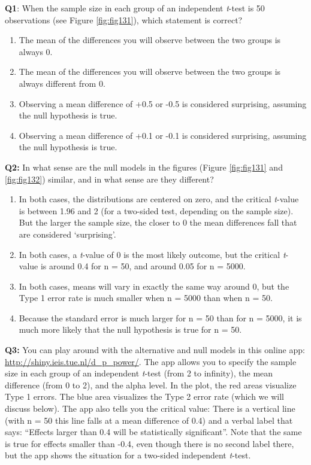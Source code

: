 \documentclass[
]{krantz}
\providecommand{\tightlist}{%
  \setlength{\itemsep}{0pt}\setlength{\parskip}{0pt}}
\begin{document}
\textbf{Q1}: When the sample size in each group of an independent \emph{t}-test is 50
observations (see Figure \ref{fig:fig131}), which statement is correct?

\begin{enumerate}
\def\labelenumi{\Alph{enumi})}
\tightlist
\item
  The mean of the differences you will observe between the two groups is always 0.
\item
  The mean of the differences you will observe between the two groups is always different from 0.
\item
  Observing a mean difference of +0.5 or -0.5 is considered surprising, assuming the null hypothesis is true.
\item
  Observing a mean difference of +0.1 or -0.1 is considered surprising, assuming the null hypothesis is true.
\end{enumerate}

\textbf{Q2:} In what sense are the null models in the figures (Figure \ref{fig:fig131} and \ref{fig:fig132}) similar, and in what sense are they different?

\begin{enumerate}
\def\labelenumi{\Alph{enumi})}
\tightlist
\item
  In both cases, the distributions are centered on zero, and the critical
  \emph{t}-value is between 1.96 and 2 (for a two-sided test, depending on the sample size). But the larger the sample size, the closer to 0 the mean differences fall that are considered `surprising'.
\item
  In both cases, a \emph{t}-value of 0 is the most likely outcome, but the critical \emph{t}-value is around 0.4 for n = 50, and around 0.05 for n = 5000.
\item
  In both cases, means will vary in exactly the same way around 0, but the Type 1 error rate is much smaller when n = 5000 than when n = 50.
\item
  Because the standard error is much larger for n = 50 than for n = 5000, it is much more likely that the null hypothesis is true for n = 50.
\end{enumerate}

\textbf{Q3:} You can play around with the alternative and null models in this online app: \url{http://shiny.ieis.tue.nl/d_p_power/}. The app allows you to specify the sample size in each group of an independent \emph{t}-test (from 2 to infinity), the mean difference (from 0 to 2), and the alpha level. In the plot, the red areas visualize Type 1 errors. The blue area visualizes the Type 2 error rate (which we will discuss below). The app also tells you the critical value: There is a vertical line (with n = 50 this line falls at a mean difference of 0.4) and a verbal label that says: ``Effects larger than 0.4 will be statistically significant''. Note that the same is true for effects smaller than -0.4, even though there is no second label there, but the app shows the situation for a two-sided independent \emph{t}-test.
\end{document}
